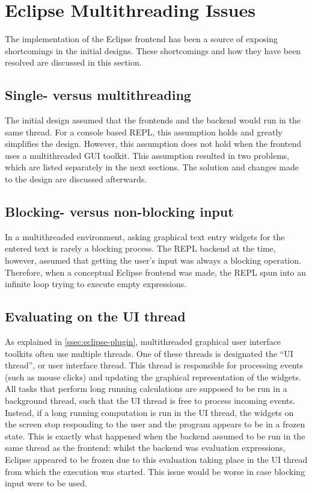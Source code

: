 \section{Eclipse Multithreading Issues}
\label{sec:eclipse-multithread}

The implementation of the Eclipse frontend has been a source of exposing
shortcomings in the initial designs. These shortcomings and how they have been
resolved are discussed in this section.

\subsection{Single- versus multithreading}

The initial design assumed that the frontends and the backend would run in the
same thread. For a console based REPL, this assumption holds and greatly
simplifies the design. However, this assumption does not hold when the frontend 
uses a multithreaded GUI toolkit. This
assumption resulted in two problems, which are listed separately in the next
sections. The solution and changes made to the design are discussed
afterwards.

\subsection{Blocking- versus non-blocking input}

In a multithreaded environment, asking graphical text entry widgets for the
entered text is rarely a blocking process. The REPL backend at the time,
however, assumed that getting the user's input was always a blocking operation.
Therefore, when a conceptual Eclipse frontend was made, the REPL spun into an
infinite loop trying to execute empty expressions.

\subsection{Evaluating on the UI thread}

As explained in \cref{ssec:eclipse-plugin}, multithreaded graphical user
interface toolkits often use multiple threads. One of these threads is
designated the ``UI thread'', or user interface thread. This thread is
responsible for processing events (such as mouse clicks) and updating the
graphical representation of the widgets. All tasks that perform long running
calculations are supposed to be run in a background thread, such that the UI
thread is free to process incoming events. Instead, if a long running
computation is run in the UI thread, the widgets on the screen stop responding
to the user and the program appears to be in a frozen state. This is exactly
what happened when the backend assumed to be run in the same thread as the
frontend: whilst the backend was evaluation expressions, Eclipse appeared to be
frozen due to this evaluation taking place in the UI thread from which the
execution was started. This issue would be worse in case blocking input
were to be used.


